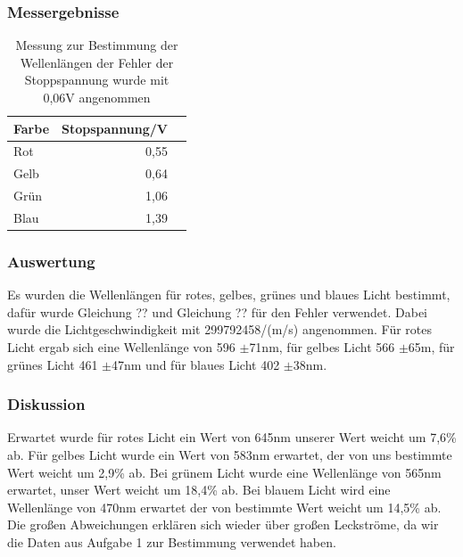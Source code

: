 \documentclass[12px]{scrartcl}
\begin{document}
\subsubsection{Messergebnisse}
\begin{table}[htbp]
\caption{Messung zur Bestimmung der Wellenlängen der Fehler der Stoppspannung wurde mit 0,06V angenommen}
\begin{center}
\begin{tabular}{|l|r|r|}
\hline
Farbe & \multicolumn{1}{l|}{Stopspannung/V} \\ \hline
Rot & 0,55 \\ \hline
Gelb & 0,64 \\ \hline
Grün & 1,06 \\ \hline
Blau & 1,39 \\ \hline
\end{tabular}
\end{center}
\label{tab:a_2.2}
\end{table}

\subsubsection{Auswertung}
Es wurden die Wellenlängen für rotes, gelbes, grünes und blaues Licht bestimmt, dafür wurde Gleichung ?? und Gleichung ?? für den Fehler verwendet. Dabei wurde die Lichtgeschwindigkeit mit 299792458/(m/s) angenommen. Für rotes Licht ergab sich eine Wellenlänge von 596 $\pm$71nm, für gelbes Licht 566 $\pm$65m, für grünes Licht 461 $\pm$47nm und für blaues Licht 402 $\pm$38nm.

\subsubsection{Diskussion}
Erwartet wurde für rotes Licht ein Wert von 645nm unserer Wert weicht um 7,6\% ab. Für gelbes Licht wurde ein Wert von 583nm erwartet, der von uns bestimmte Wert weicht um  2,9\% ab. Bei grünem Licht wurde eine Wellenlänge von 565nm erwartet, unser Wert weicht um 18,4\% ab. Bei blauem Licht wird eine Wellenlänge von 470nm erwartet der von bestimmte Wert weicht um 14,5\% ab. Die großen Abweichungen erklären sich wieder über großen Leckströme, da wir die Daten aus Aufgabe 1 zur Bestimmung verwendet haben.
\end{document}
